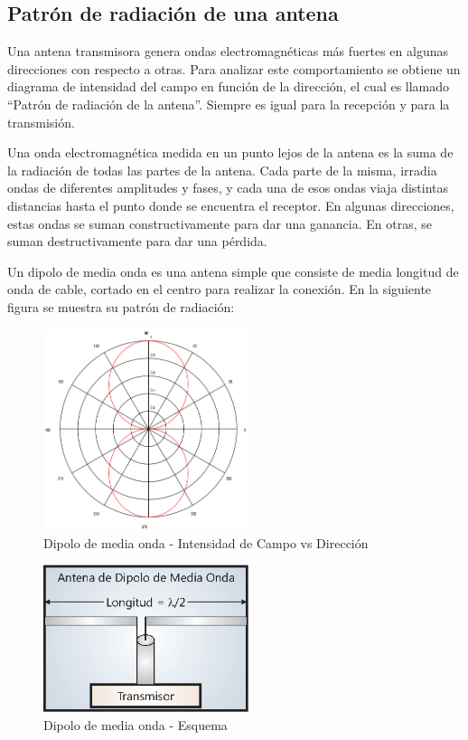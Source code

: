 \subsection{Patrón de radiación de una antena}

Una antena transmisora genera ondas electromagnéticas más fuertes en algunas direcciones con respecto a otras. Para analizar este comportamiento se obtiene un diagrama de intensidad del campo en función de la dirección, el cual es llamado ``Patrón de radiación de la antena''. Siempre es igual para la recepción y para la transmisión.

Una onda electromagnética medida en un punto lejos de la antena es la suma de la radiación de todas las partes de la antena. Cada parte de la misma, irradia ondas de diferentes amplitudes y fases, y cada una de esos ondas viaja distintas distancias hasta el punto donde se encuentra el receptor. En algunas direcciones, estas ondas se suman constructivamente para dar una ganancia. En otras, se suman destructivamente para dar una pérdida.

Un dipolo de media onda es una antena simple que consiste de media longitud de onda de cable, cortado en el centro para realizar la conexión. En la siguiente figura se muestra su patrón de radiación:

\begin{figure}[htb!]
        \centering
        \includegraphics[width=6cm]{./figures/C02-half_wave_dipole}
        \caption{Dipolo de media onda - Intensidad de Campo vs Dirección}
        \label{fig:half_wave_dipole}
\end{figure}

\begin{figure}[htb!]
        \centering
        \includegraphics[width=6cm]{./figures/C02-half_wave_dipole_2}
        \caption{Dipolo de media onda - Esquema}
        \label{fig:half_wave_dipole_2}
\end{figure}

